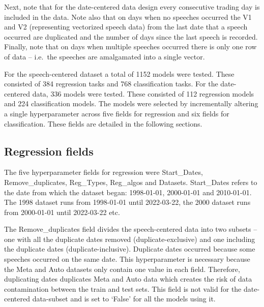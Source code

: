 \documentclass[11pt,preprint, authoryear]{elsarticle}
\numberwithin{equation}{section}
\numberwithin{figure}{section}
\numberwithin{table}{section}
\begin{document}
Next, note that for the date-centered data design every consecutive
trading day is included in the data. Note also that on days when no
speeches occurred the V1 and V2 (representing vectorized speech data)
from the last date that a speech occurred are duplicated and the number
of days since the last speech is recorded. Finally, note that on days
when multiple speeches occurred there is only one row of data --
i.e.~the speeches are amalgamated into a single vector.

For the speech-centered dataset a total of 1152 models were tested.
These consisted of 384 regression tasks and 768 classification tasks.
For the date-centered data, 336 models were tested. These consisted of
112 regression models and 224 classification models. The models were
selected by incrementally altering a single hyperparameter across five
fields for regression and six fields for classification. These fields
are detailed in the following sections.

\hypertarget{regression-fields}{%
\subsection{Regression fields}\label{regression-fields}}

The five hyperparameter fields for regression were Start\_Dates,
Remove\_duplicates, Reg\_Types, Reg\_algos and Datasets. Start\_Dates
refers to the date from which the dataset began: 1998-01-01, 2000-01-01
and 2010-01-01. The 1998 dataset runs from 1998-01-01 until 2022-03-22,
the 2000 dataset runs from 2000-01-01 until 2022-03-22 etc.

The Remove\_duplicates field divides the speech-centered data into two
subsets -- one with all the duplicate dates removed
(duplicate-exclusive) and one including the duplicate dates
(duplicate-inclusive). Duplicate dates occurred because some speeches
occurred on the same date. This hyperparameter is necessary because the
Meta and Auto datasets only contain one value in each field. Therefore,
duplicating dates duplicates Meta and Auto data which creates the risk
of data contamination between the train and test sets. This field is not
valid for the date-centered data-subset and is set to `False' for all
the models using it.
\end{document}
